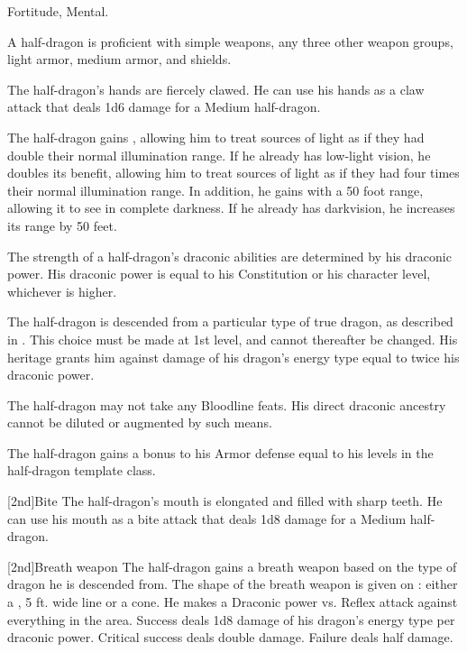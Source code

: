               Fortitude,  Mental.

            A half-dragon is proficient with simple weapons, any three other weapon groups, light armor, medium armor, and shields.

            The half-dragon's hands are fiercely clawed.
            He can use his hands as a claw attack that deals 1d6 damage for a Medium half-dragon.

            The half-dragon gains , allowing him to treat sources of light as if they had double their normal illumination range.
            If he already has low-light vision, he doubles its benefit, allowing him to treat sources of light as if they had four times their normal illumination range.
            In addition, he gains  with a 50 foot range, allowing it to see in complete darkness.
            If he already has darkvision, he increases its range by 50 feet.

            The strength of a half-dragon's draconic abilities are determined by his draconic power.
            His draconic power is equal to his Constitution or his character level, whichever is higher.

             The half-dragon is descended from a particular type of true dragon, as described in . This choice must be made at 1st level, and cannot thereafter be changed.
            His heritage grants him  against damage of his dragon's energy type equal to twice his draconic power.

            The half-dragon may not take any Bloodline feats. His direct draconic ancestry cannot be diluted or augmented by such means.

             The half-dragon gains a bonus to his Armor defense equal to his levels in the half-dragon template class.

            [2nd]{Bite} 
            The half-dragon's mouth is elongated and filled with sharp teeth.
            He can use his mouth as a bite attack that deals 1d8 damage for a Medium half-dragon.

            [2nd]{Breath weapon} The half-dragon gains a breath weapon based on the type of dragon he is descended from.
            The shape of the breath weapon is given on : either a \arealarge, 5 ft. wide line or a \areamed cone.
            He makes a Draconic power vs. Reflex attack against everything in the area.
            Success deals 1d8 damage of his dragon's energy type per draconic power.
            Critical success deals double damage.
            Failure deals half damage.

